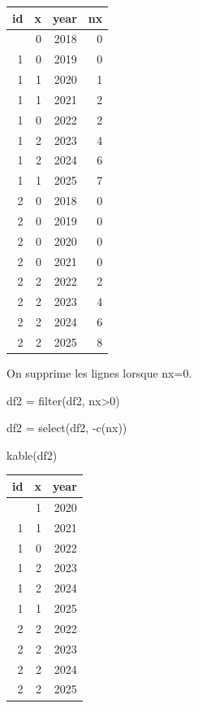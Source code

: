 \documentclass[
  12pt,
  letterpaper,
  DIV=11,
  numbers=noendperiod,
  onepage,
  openany]{scrreprt}
\newenvironment{Shaded}{\begin{snugshade}}{\end{snugshade}}
\newcommand{\DecValTok}[1]{\textcolor[rgb]{0.86,0.86,0.80}{#1}}
\newcommand{\FunctionTok}[1]{\textcolor[rgb]{0.94,0.94,0.56}{#1}}
\newcommand{\NormalTok}[1]{\textcolor[rgb]{0.80,0.80,0.80}{#1}}
\newcommand{\OtherTok}[1]{\textcolor[rgb]{0.94,0.94,0.56}{#1}}
\newcommand{\SpecialCharTok}[1]{\textcolor[rgb]{0.86,0.64,0.64}{#1}}
\begin{document}
\begin{longtable}[]{@{}rrrr@{}}
\toprule\noalign{}
id & x & year & nx \\
\midrule\noalign{}
\endhead
\bottomrule\noalign{}
\endlastfoot
1 & 0 & 2018 & 0 \\
1 & 0 & 2019 & 0 \\
1 & 1 & 2020 & 1 \\
1 & 1 & 2021 & 2 \\
1 & 0 & 2022 & 2 \\
1 & 2 & 2023 & 4 \\
1 & 2 & 2024 & 6 \\
1 & 1 & 2025 & 7 \\
2 & 0 & 2018 & 0 \\
2 & 0 & 2019 & 0 \\
2 & 0 & 2020 & 0 \\
2 & 0 & 2021 & 0 \\
2 & 2 & 2022 & 2 \\
2 & 2 & 2023 & 4 \\
2 & 2 & 2024 & 6 \\
2 & 2 & 2025 & 8 \\
\end{longtable}

On supprime les lignes lorsque nx=0.

\begin{Shaded}
\begin{Highlighting}[]
\NormalTok{df2 }\OtherTok{=} \FunctionTok{filter}\NormalTok{(df2, nx}\SpecialCharTok{\textgreater{}}\DecValTok{0}\NormalTok{)}

\NormalTok{df2 }\OtherTok{=} \FunctionTok{select}\NormalTok{(df2, }\SpecialCharTok{{-}}\FunctionTok{c}\NormalTok{(nx))}

\FunctionTok{kable}\NormalTok{(df2)    }
\end{Highlighting}
\end{Shaded}

\begin{longtable}[]{@{}rrr@{}}
\toprule\noalign{}
id & x & year \\
\midrule\noalign{}
\endhead
\bottomrule\noalign{}
\endlastfoot
1 & 1 & 2020 \\
1 & 1 & 2021 \\
1 & 0 & 2022 \\
1 & 2 & 2023 \\
1 & 2 & 2024 \\
1 & 1 & 2025 \\
2 & 2 & 2022 \\
2 & 2 & 2023 \\
2 & 2 & 2024 \\
2 & 2 & 2025 \\
\end{longtable}
\end{document}
